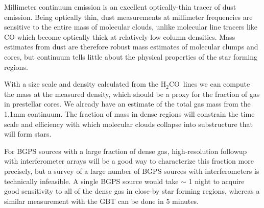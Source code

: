 \documentclass[11pt, preprint]{aastex}
\newcommand{\formaldehyde}{H\ensuremath{_2}CO}
\begin{document}

Millimeter continuum emission is an excellent optically-thin tracer of dust
emission.  Being optically thin, dust measurements at millimeter frequencies
are sensitive to the entire mass of molecular clouds, unlike molecular line
tracers like CO which become optically thick at relatively low column
densities.  Mass estimates from dust are therefore robust mass estimates of
molecular clumps and cores, but continuum tells little about the physical
properties of the star forming regions.  

With a size scale and density calculated from the \formaldehyde\ lines we can
compute the mass at the measured density, which should be a proxy for the
fraction of gas in prestellar cores.  We already have an estimate of the total
gas mass from the 1.1mm continuum.  The fraction of mass in dense regions will
constrain the time scale and efficiency with which molecular clouds collapse into
substructure that will form stars.  

For BGPS sources with a large fraction of dense gas, high-resolution followup
with interferometer arrays will be a good way to characterize this fraction
more precisely, but a survey of a large number of BGPS sources with
interferometers is technically infeasible.  A single BGPS source would take
$\sim$ 1 night to acquire good sensitivity to all of the dense gas in close-by
star forming regions, whereas a similar measurement with the GBT can be done in
5 minutes.  

\end{document}

